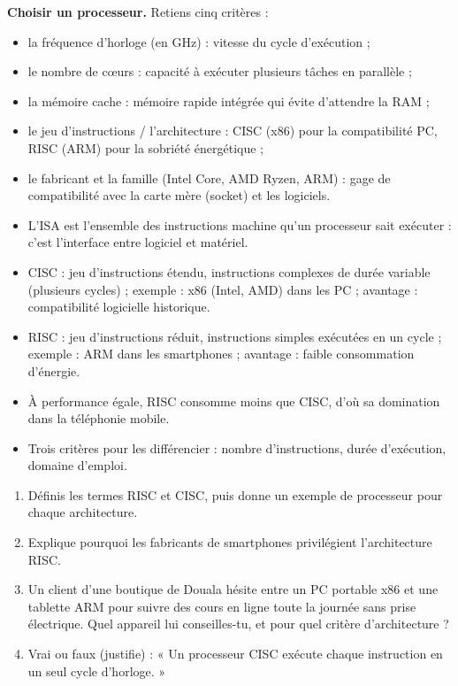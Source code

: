 \documentclass[11pt]{article}
\newcommand{\cle}[1]{{\popxbold\color{popdark}#1}}
\begin{document}
\textbf{Choisir un processeur.} Retiens cinq critères :
\begin{itemize}
  \item la \cle{fréquence d'horloge} (en GHz) : vitesse du cycle d'exécution ;
  \item le \cle{nombre de cœurs} : capacité à exécuter plusieurs tâches en parallèle ;
  \item la \cle{mémoire cache} : mémoire rapide intégrée qui évite d'attendre la RAM ;
  \item le \cle{jeu d'instructions / l'architecture} : CISC (x86) pour la compatibilité PC, RISC (ARM) pour la sobriété énergétique ;
  \item le \cle{fabricant et la famille} (Intel Core, AMD Ryzen, ARM) : gage de compatibilité avec la carte mère (socket) et les logiciels.
\end{itemize}

\begin{aretenir}
\begin{itemize}
  \item L'\cle{ISA} est l'ensemble des instructions machine qu'un processeur sait exécuter : c'est l'interface entre logiciel et matériel.
  \item \cle{CISC} : jeu d'instructions étendu, instructions complexes de durée variable (plusieurs cycles) ; exemple : x86 (Intel, AMD) dans les PC ; avantage : compatibilité logicielle historique.
  \item \cle{RISC} : jeu d'instructions réduit, instructions simples exécutées en un cycle ; exemple : ARM dans les smartphones ; avantage : faible consommation d'énergie.
  \item À performance égale, RISC consomme moins que CISC, d'où sa domination dans la téléphonie mobile.
  \item Trois critères pour les différencier : nombre d'instructions, durée d'exécution, domaine d'emploi.
\end{itemize}
\end{aretenir}

\begin{exercice}
\begin{enumerate}
  \item Définis les termes RISC et CISC, puis donne un exemple de processeur pour chaque architecture.
  \item Explique pourquoi les fabricants de smartphones privilégient l'architecture RISC.
  \item Un client d'une boutique de Douala hésite entre un PC portable x86 et une tablette ARM pour suivre des cours en ligne toute la journée sans prise électrique. Quel appareil lui conseilles-tu, et pour quel critère d'architecture ?
  \item Vrai ou faux (justifie) : « Un processeur CISC exécute chaque instruction en un seul cycle d'horloge. »
\end{enumerate}
\end{exercice}
\end{document}
